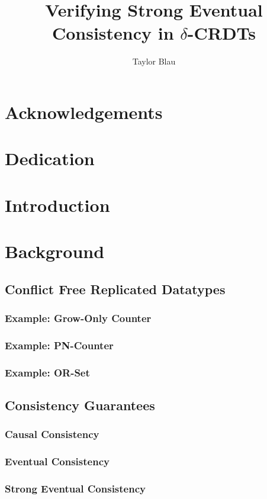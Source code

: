 \documentclass{thesis}
\title{Verifying Strong Eventual Consistency in $\delta$-CRDTs}
\author{Taylor Blau}
\begin{document}

  

  \frontmatter
  \cleardoublepage

  
  \chapter{Acknowledgements}
  \chapter{Dedication}

  \tableofcontents

  \mainmatter
  \chapter{Introduction}

  \chapter{Background}
  \section{Conflict Free Replicated Datatypes}
  \subsection{Example: Grow-Only Counter}
  \subsection{Example: PN-Counter}
  \subsection{Example: OR-Set}
  \section{Consistency Guarantees}
  \subsection{Causal Consistency}
  \subsection{Eventual Consistency}
  \subsection{Strong Eventual Consistency}
\end{document}

